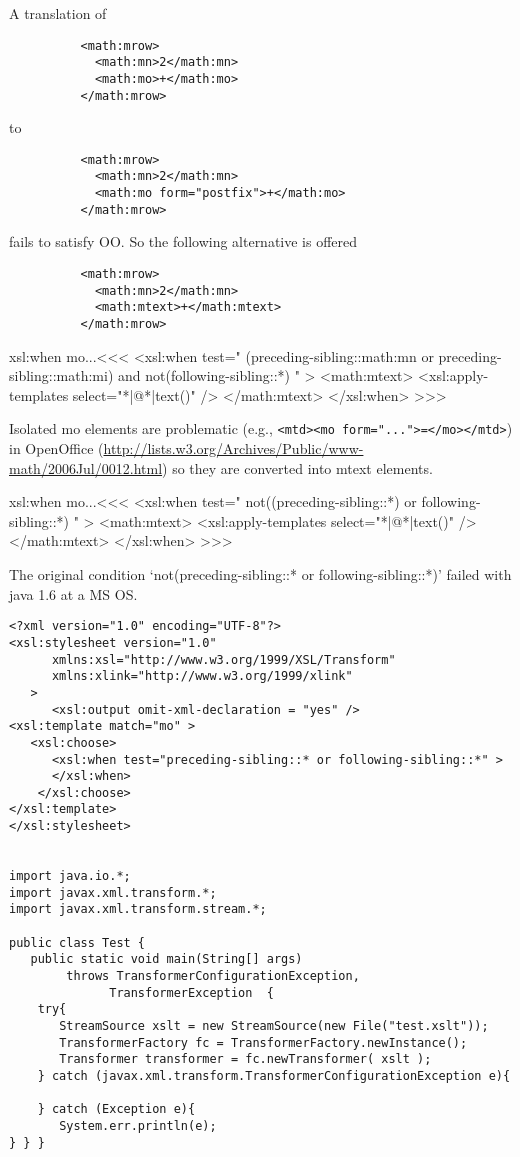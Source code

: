 \documentclass{article}
\begin{document}
A translation of

\begin{verbatim}
          <math:mrow> 
            <math:mn>2</math:mn> 
            <math:mo>+</math:mo> 
          </math:mrow> 
\end{verbatim}

to

\begin{verbatim}
          <math:mrow> 
            <math:mn>2</math:mn> 
            <math:mo form="postfix">+</math:mo> 
          </math:mrow> 
\end{verbatim}

fails to satisfy OO. So the following alternative is offered

\begin{verbatim}
          <math:mrow> 
            <math:mn>2</math:mn> 
            <math:mtext>+</math:mtext> 
          </math:mrow> 
\end{verbatim}


\<xsl:when mo...\><<<
<xsl:when test=" 
   (preceding-sibling::math:mn or preceding-sibling::math:mi)
   and not(following-sibling::*)
" >
   <math:mtext>
      <xsl:apply-templates select="*|@*|text()" />
   </math:mtext>
</xsl:when> 
>>>




Isolated mo elements are problematic (e.g., 
\verb'<mtd><mo form="...">=</mo></mtd>') in OpenOffice
(\url{http://lists.w3.org/Archives/Public/www-math/2006Jul/0012.html})
so they are converted into mtext elements.




\<xsl:when mo...\><<<
<xsl:when test=" 
   not((preceding-sibling::*) or following-sibling::*)
" >
   <math:mtext>
      <xsl:apply-templates select="*|@*|text()" />
   </math:mtext>
</xsl:when> 
>>>

The original condition 
   `not(preceding-sibling::* or following-sibling::*)'
failed with java 1.6 at a MS OS. 


\begin{verbatim}
<?xml version="1.0" encoding="UTF-8"?> 
<xsl:stylesheet version="1.0"
      xmlns:xsl="http://www.w3.org/1999/XSL/Transform"
      xmlns:xlink="http://www.w3.org/1999/xlink"
   >
      <xsl:output omit-xml-declaration = "yes" />
<xsl:template match="mo" >
   <xsl:choose>
      <xsl:when test="preceding-sibling::* or following-sibling::*" >
      </xsl:when>
    </xsl:choose>
</xsl:template>
</xsl:stylesheet>


import java.io.*;
import javax.xml.transform.*;
import javax.xml.transform.stream.*;

public class Test {
   public static void main(String[] args)
        throws TransformerConfigurationException,
              TransformerException  {
    try{
       StreamSource xslt = new StreamSource(new File("test.xslt"));
       TransformerFactory fc = TransformerFactory.newInstance();
       Transformer transformer = fc.newTransformer( xslt );
    } catch (javax.xml.transform.TransformerConfigurationException e){
       
    } catch (Exception e){
       System.err.println(e);
} } }
\end{verbatim}
\end{document}
